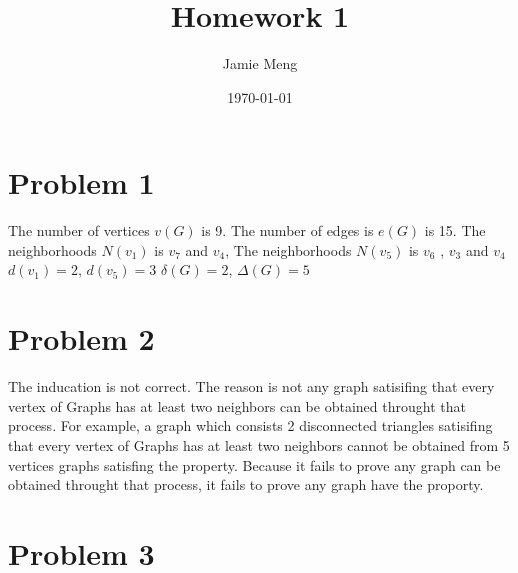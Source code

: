 \documentclass[11pt]{article}
\begin{document}
\title{Homework 1}
\author{Jamie Meng}
\date{\today}

\maketitle
\section*{Problem 1}

The number of vertices $v(G)$ is 9.\newline
The number of edges is $e(G)$ is 15.\newline
The neighborhoods $N(v_1)$ is $v_7$ and $v_4$,\newline
The neighborhoods $N(v_5)$ is $v_6$ , $v_3$ and $v_4$\newline
$d(v_1)=2$, $d(v_5)=3$\newline
$\delta(G)=2 $, $\Delta(G)=5 $



\section*{Problem 2}

The inducation is not correct. The reason is not any graph satisifing that every vertex of Graphs has at least two neighbors can be obtained throught that process. For example, a graph which consists 2 disconnected triangles satisifing that every vertex of Graphs has at least two neighbors cannot be obtained from 5 vertices graphs satisfing the property. Because it fails to prove any graph can be obtained throught that process, it fails to prove any graph have the proporty.

\section*{Problem 3}
\end{document}
